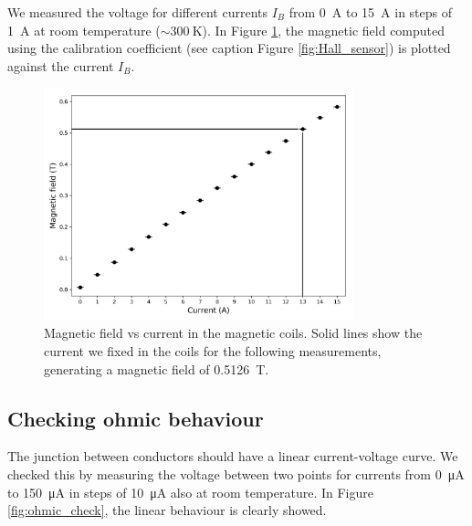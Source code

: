 \documentclass[11pt,a4paper]{article}
\begin{document}
We measured the voltage for different currents $I_B$ from \SI{0}{\ampere} to \SI{15}{\ampere} in steps of \SI{1}{\ampere} at room temperature ($\sim\SI{300}{\kelvin}$). In Figure \ref{fig:magnetic_field}, the magnetic field computed using the calibration coefficient (see caption Figure \ref{fig:Hall_sensor}) is plotted against the current $I_B$.

\begin{figure}[ht]
\centering
\includegraphics[width=0.8\textwidth]{Magnetic_field_vs_current}
\caption{Magnetic field vs current in the magnetic coils. Solid lines show the current we fixed in the coils for the following measurements, generating a magnetic field of \SI{0.5126}{\tesla}.}
\label{fig:magnetic_field}
\end{figure}

\subsection{Checking ohmic behaviour}

The junction between conductors should have a linear current-voltage curve. We checked this by measuring the voltage between two points for currents from \SI{0}{\micro\ampere} to \SI{150}{\micro\ampere} in steps of \SI{10}{\micro\ampere} also at room temperature. In Figure \ref{fig:ohmic_check}, the linear behaviour is clearly showed.
\end{document}
